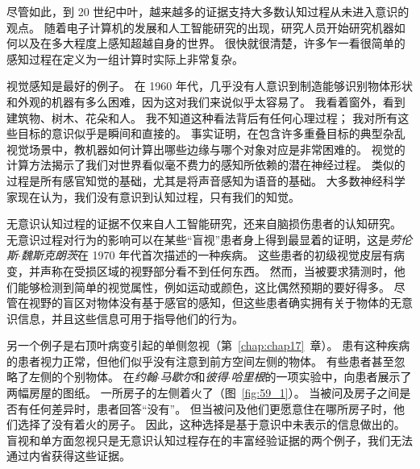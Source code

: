 尽管如此，到 20 世纪中叶，越来越多的证据支持大多数认知过程从未进入意识的观点。
随着电子计算机的发展和人工智能研究的出现，研究人员开始研究机器如何以及在多大程度上感知超越自身的世界。
很快就很清楚，许多乍一看很简单的感知过程在定义为一组计算时实际上非常复杂。


视觉感知是最好的例子。
在 1960 年代，几乎没有人意识到制造能够识别物体形状和外观的机器有多么困难，因为这对我们来说似乎太容易了。
我看着窗外，看到建筑物、树木、花朵和人。
我不知道这种看法背后有任何心理过程；
我对所有这些目标的意识似乎是瞬间和直接的。
事实证明，在包含许多重叠目标的典型杂乱视觉场景中，教机器如何计算出哪些边缘与哪个对象对应是非常困难的。
视觉的计算方法揭示了我们对世界看似毫不费力的感知所依赖的潜在神经过程。
类似的过程是所有感官知觉的基础，尤其是将声音感知为语音的基础。
大多数神经科学家现在认为，我们没有意识到认知过程，只有我们的知觉。


无意识认知过程的证据不仅来自人工智能研究，还来自脑损伤患者的认知研究。
无意识过程对行为的影响可以在某些“盲视”患者身上得到最显着的证明，这是\textit{劳伦斯$\cdot$魏斯克朗茨}在 1970 年代首次描述的一种疾病。
这些患者的初级视觉皮层有病变，并声称在受损区域的视野部分看不到任何东西。
然而，当被要求猜测时，他们能够检测到简单的视觉属性，例如运动或颜色，这比偶然预期的要好得多。
尽管在视野的盲区对物体没有基于感官的感知，但这些患者确实拥有关于物体的无意识信息，并且这些信息可用于指导他们的行为。


另一个例子是右顶叶病变引起的单侧忽视（第~\ref{chap:chap17}~章）。
患有这种疾病的患者视力正常，但他们似乎没有注意到前方空间左侧的物体。
有些患者甚至忽略了左侧的个别物体。
在\textit{约翰$\cdot$马歇尔}和\textit{彼得$\cdot$哈里根}的一项实验中，向患者展示了两幅房屋的图纸。
一所房子的左侧着火了（图~\ref{fig:59_1}）。
当被问及房子之间是否有任何差异时，患者回答“没有”。 但当被问及他们更愿意住在哪所房子时，他们选择了没有着火的房子。
因此，这种选择是基于意识中未表示的信息做出的。
盲视和单方面忽视只是无意识认知过程存在的丰富经验证据的两个例子，我们无法通过内省获得这些证据。


